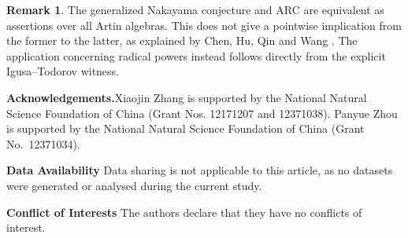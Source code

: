 \documentclass[a4paper,reqno]{amsart}
\numberwithin{equation}{section}
\theoremstyle{definition}
\newtheorem{rem}[thm]{Remark}
\begin{document}
\begin{rem}
The generalized Nakayama conjecture and ARC are equivalent as assertions over all Artin algebras. This does not give a pointwise implication from the former to the latter, as explained by Chen, Hu, Qin and Wang \cite[Introduction]{CHQW2023}. The application concerning radical powers instead follows directly from the explicit Igusa--Todorov witness.
\end{rem}

\noindent\textbf{Acknowledgements.}\quad Xiaojin Zhang is supported by the National Natural Science Foundation of China (Grant Nos. 12171207 and 12371038). Panyue Zhou is supported by the National Natural Science Foundation of China (Grant No.~12371034).

\vspace{3mm}
\noindent\textbf{Data Availability}\hspace{2mm}
Data sharing is not applicable to this article, as no datasets were generated or analysed during the current study.

\vspace{3mm}
\noindent\textbf{Conflict of Interests}\hspace{2mm}
The authors declare that they have no conflicts of interest.
\end{document}
